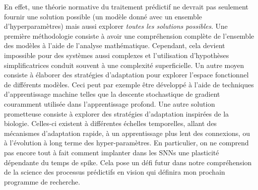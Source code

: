 \documentclass[11pt,french,a4paper,oneside]{article}%
\begin{document}
En effet, une théorie normative du traitement prédictif ne devrait pas
seulement fournir une solution possible (un modèle donné avec un
ensemble d'hyperparamètres) mais aussi explorer \emph{toutes les
solutions possibles}. Une première méthodologie consiste à avoir une
compréhension complète de l'ensemble des modèles à l'aide de l'analyse
mathématique. Cependant, cela devient impossible pour des systèmes aussi
complexes et l'utilisation d'hypothèses simplificatrices conduit souvent
à une complexité superficielle. Un autre moyen consiste à élaborer des
stratégies d'adaptation pour explorer l'espace fonctionnel de différents
modèles. Ceci peut par exemple être développé à l'aide de techniques
d'apprentissage machine telles que la descente stochastique de gradient
couramment utilisée dans l'apprentissage profond. Une autre solution
prometteuse consiste à explorer des stratégies d'adaptation inspirées de
la biologie. Celles-ci existent à différentes échelles
temporelles, allant des mécanismes d'adaptation rapide, à un
apprentissage plus lent des connexions, ou à l'évolution à long terme
des hyper-paramètres. En particulier, on ne comprend pas encore tout à
fait comment implanter dans les SNNs une plasticité dépendante du temps de
spike. Cela pose un défi futur dans notre compréhension de la science des
processus prédictifs en vision qui définira mon prochain programme de recherche.
\printbibliography
\end{document}
